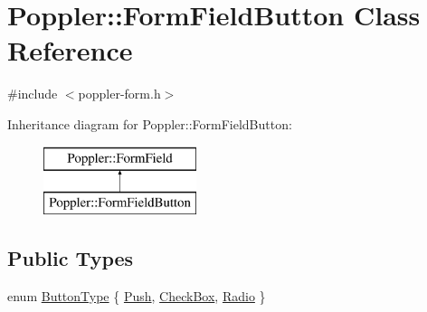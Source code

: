 \hypertarget{class_poppler_1_1_form_field_button}{}\section{Poppler\+:\+:Form\+Field\+Button Class Reference}
\label{class_poppler_1_1_form_field_button}


{\ttfamily \#include $<$poppler-\/form.\+h$>$}

Inheritance diagram for Poppler\+:\+:Form\+Field\+Button\+:\begin{figure}[H]
\begin{center}
\leavevmode
\includegraphics[height=2.000000cm]{class_poppler_1_1_form_field_button}
\end{center}
\end{figure}
\subsection*{Public Types}
\begin{DoxyCompactItemize}
\item 
enum \hyperlink{class_poppler_1_1_form_field_button_acb50171e446769665a4c671c73385997}{Button\+Type} \{ \hyperlink{class_poppler_1_1_form_field_button_acb50171e446769665a4c671c73385997af4df87e890e1960e76105be3e3b21f70}{Push}, 
\hyperlink{class_poppler_1_1_form_field_button_acb50171e446769665a4c671c73385997a15b510446b876a08a7a5f451dcfd24c6}{Check\+Box}, 
\hyperlink{class_poppler_1_1_form_field_button_acb50171e446769665a4c671c73385997a216190823ae210e968fc0f48a19aa897}{Radio}
 \}
\end{DoxyCompactItemize}

